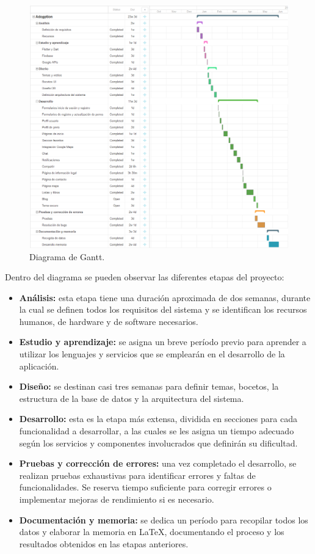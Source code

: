\documentclass[a4paper, 12pt]{article}
\begin{document}
\begin{figure}[H]
	{\includegraphics[width=15cm]{diagram/GanntSmall2.png}\par}
	\captionsetup{format=plain,indention=0pt}
	\caption{Diagrama de Gantt.}
	\label{fig:diagramagantt}
\end{figure}

Dentro del diagrama se pueden observar las diferentes etapas del proyecto:

\begin{itemize}[noitemsep]
	\item \textbf{Análisis:} esta etapa tiene una duración aproximada de dos semanas, durante la cual se definen todos los requisitos del sistema y se identifican los recursos humanos, de hardware y de software necesarios.
	\item \textbf{Estudio y aprendizaje:} se asigna un breve período previo para aprender a utilizar los lenguajes y servicios que se emplearán en el desarrollo de la aplicación.
	\item \textbf{Diseño:} se destinan casi tres semanas para definir temas, bocetos, la estructura de la base de datos y la arquitectura del sistema.
	\item \textbf{Desarrollo:} esta es la etapa más extensa, dividida en secciones para cada funcionalidad a desarrollar, a las cuales se les asigna un tiempo adecuado según los servicios y componentes involucrados que definirán su dificultad.
	\item \textbf{Pruebas y corrección de errores:} una vez completado el desarrollo, se realizan pruebas exhaustivas para identificar errores y faltas de funcionalidades. Se reserva tiempo suficiente para corregir errores o implementar mejoras de rendimiento si es necesario.
	\item \textbf{Documentación y memoria:} se dedica un período para recopilar todos los datos y elaborar la memoria en LaTeX, documentando el proceso y los resultados obtenidos en las etapas anteriores.
\end{itemize}
\end{document}
